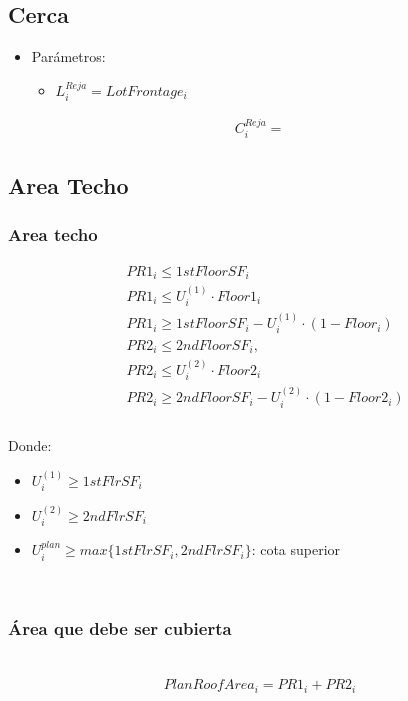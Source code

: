 \documentclass{article}
\begin{document}
\subsection{Cerca}
\begin{itemize}
    \item Parámetros:
    \begin{itemize}
        \item $L^{Reja}_{i}=LotFrontage_{i}$
    \end{itemize}
\end{itemize}
\begin{align}
    C_{i}^{Reja}=
\end{align}

\subsection{Area Techo}

\subsubsection{Area techo}
\begin{align}
    &PR1_{i} \leq 1stFloorSF_{i}\\
    &PR1_{i} \leq U_{i}^{(1)}\cdot Floor1_{i}\\
    &PR1_{i} \geq 1stFloorSF_{i}-U_{i}^{(1)}\cdot (1-Floor_{i})\\
    &PR2_{i} \leq 2ndFloorSF_{i},\\
    &PR2_{i} \leq U_{i}^{(2)}\cdot Floor2_{i}\\
    &PR2_{i} \geq 2ndFloorSF_{i}-U_{i}^{(2)}\cdot (1-Floor2_{i})\\
\end{align}
\\
Donde:
\begin{itemize}
    \item $U_{i}^{(1)}\geq 1stFlrSF_{i}$
    \item $U_{i}^{(2)}\geq 2ndFlrSF_{i}$
    \item $U_{i}^{plan} \geq max\{1stFlrSF_{i},2ndFlrSF_{i}\}$: cota superior
\end{itemize}
\\
\subsubsection{Área que debe ser cubierta}\\
\begin{align}
    PlanRoofArea_{i}=PR1_{i}+PR2_{i}\\
\end{align}
\end{document}
